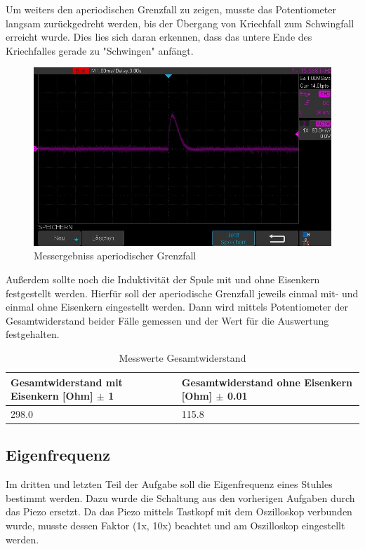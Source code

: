 \documentclass[12pt,a4paper,twoside]{article}
\begin{document}
\noindent
Um weiters den aperiodischen Grenzfall zu zeigen, musste das Potentiometer langsam zurückgedreht werden, bis der Übergang von Kriechfall zum Schwingfall erreicht wurde.
Dies lies sich daran erkennen, dass das untere Ende des Kriechfalles gerade zu "Schwingen" anfängt.

\begin{figure}[H]
    \centering
    \includegraphics[width=0.6\linewidth, angle=0]{Messergebnisse/3.3 Grenzfall/GrenzfallNahe.jpg}
    \caption{Messergebniss aperiodischer Grenzfall}
    \label{fig:MessergebnissAperiodischerGrenzfall}
\end{figure}

\noindent
Außerdem sollte noch die Induktivität der Spule mit und ohne Eisenkern festgestellt werden. Hierfür soll der aperiodische Grenzfall jeweils einmal mit- und einmal ohne Eisenkern eingestellt werden. 
Dann wird mittels Potentiometer der Gesamtwiderstand beider Fälle gemessen und der Wert für die Auswertung festgehalten.

\begin{table}[H]
    \centering
    \caption{Messwerte Gesamtwiderstand}
    \label{tab:messwerteGesamtwiderstand}
    \begin{tabular}{| l | l |}
        \hline
        Gesamtwiderstand mit Eisenkern [Ohm] $\pm$ 1  & Gesamtwiderstand ohne Eisenkern [Ohm] $\pm$ 0.01 \\
        \hline
        298.0 & 115.8 \\
        \hline
    \end{tabular}
\end{table}


\subsection{Eigenfrequenz}

Im dritten und letzten Teil der Aufgabe soll die Eigenfrequenz eines Stuhles bestimmt werden. Dazu wurde die Schaltung aus den vorherigen Aufgaben durch das Piezo ersetzt.
Da das Piezo mittels Tastkopf mit dem Oszilloskop verbunden wurde, musste dessen Faktor (1x, 10x) beachtet und am Oszilloskop eingestellt werden. \newline
\end{document}
